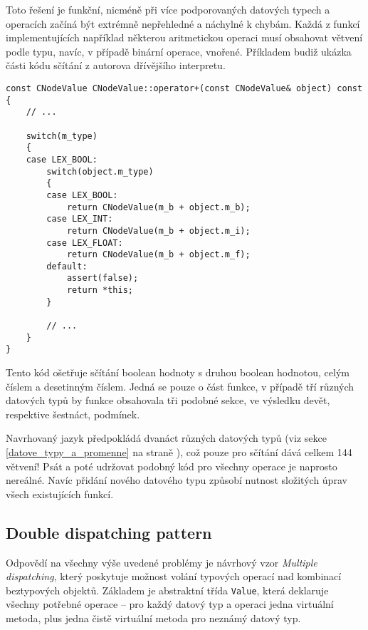 \documentclass[11pt,twoside,a4paper]{book}
\begin{document}
Toto řešení je funkční, nicméně při více podporovaných datových typech a operacích začíná být extrémně nepřehledné a náchylné k chybám. Každá z funkcí implementujících například některou aritmetickou operaci musí obsahovat větvení podle typu, navíc, v případě binární operace, vnořené. Příkladem budiž ukázka části kódu sčítání z autorova dřívějšího interpretu.



\begin{verbatim}
const CNodeValue CNodeValue::operator+(const CNodeValue& object) const
{
    // ...

    switch(m_type)
    {
    case LEX_BOOL:
        switch(object.m_type)
        {
        case LEX_BOOL:
            return CNodeValue(m_b + object.m_b);
        case LEX_INT:
            return CNodeValue(m_b + object.m_i);
        case LEX_FLOAT:
            return CNodeValue(m_b + object.m_f);
        default:
            assert(false);
            return *this;
        }

        // ...
    }
}
\end{verbatim}

Tento kód ošetřuje sčítání boolean hodnoty s druhou boolean hodnotou, celým číslem a desetinným číslem. Jedná se pouze o část funkce, v případě tří různých datových typů by funkce obsahovala tři podobné sekce, ve výsledku devět, respektive šestnáct, podmínek.

Navrhovaný jazyk předpokládá dvanáct různých datových typů (viz sekce \ref{datove_typy_a_promenne} na straně \pageref{datove_typy_a_promenne}), což pouze pro sčítání dává celkem 144 větvení! Psát a poté udržovat podobný kód pro všechny operace je naprosto nereálné. Navíc přidání nového datového typu způsobí nutnost slo\-ži\-tých úprav všech existujících funkcí.


\subsection{Double dispatching pattern}


Odpovědí na všechny výše uvedené problémy je návrhový vzor \textit{Multiple dispatching}, který poskytuje možnost volání typových operací nad kombinací beztypových objektů. Základem je abstraktní třída \texttt{Value}, která deklaruje všechny potřebné operace -- pro každý datový typ a operaci jedna virtuální metoda, plus jedna čistě virtuální metoda pro neznámý datový typ.
\end{document}
